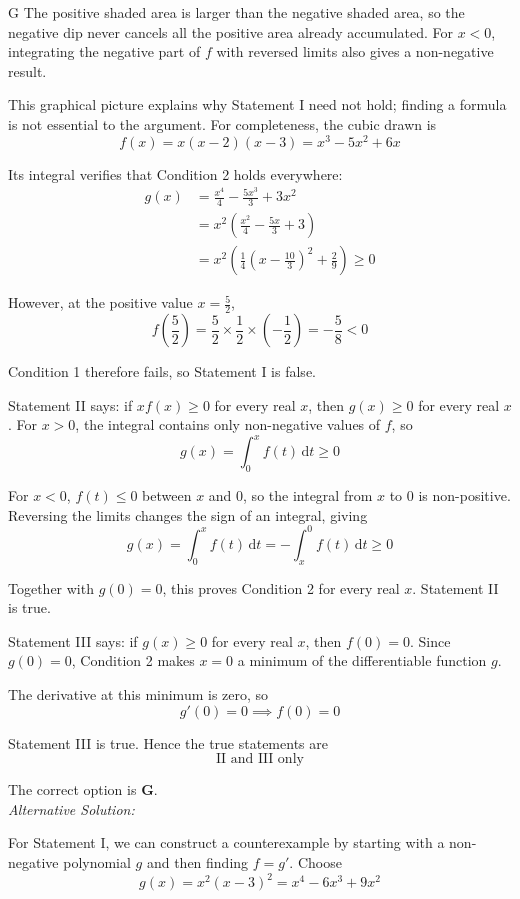 \documentclass[11pt,a4paper]{article}
\begin{document}
\begin{enumerate}[label=\textbf{\arabic*.},leftmargin=*,itemsep=0pt,start=10]
\begin{djsSolution}{G}
The positive shaded area is larger than the negative shaded area, so the negative dip never cancels all the positive area already accumulated. For $x<0$, integrating the negative part of $f$ with reversed limits also gives a non-negative result.

This graphical picture explains why Statement I need not hold; finding a formula is not essential to the argument. For completeness, the cubic drawn is
\[
f(x)=x(x-2)(x-3)=x^3-5x^2+6x
\]

Its integral verifies that Condition 2 holds everywhere:
\[
\begin{aligned}
g(x)&=\frac{x^4}{4}-\frac{5x^3}{3}+3x^2\\[8pt]
&=x^2\left(\frac{x^2}{4}-\frac{5x}{3}+3\right)\\[8pt]
&=x^2\left(\frac14\left(x-\frac{10}{3}\right)^2+\frac29\right)\geq0
\end{aligned}
\]

However, at the positive value $x=\frac52$,
\[
f\left(\frac52\right)=\frac52\times\frac12\times\left(-\frac12\right)=-\frac58<0
\]

Condition 1 therefore fails, so Statement I is false.

Statement II says: if $xf(x)\geq0$ for every real $x$, then $g(x)\geq0$ for every real $x$. For $x>0$, the integral contains only non-negative values of $f$, so
\[
g(x)=\int_0^x f(t)\,\mathrm{d}t\geq0
\]

For $x<0$, $f(t)\leq0$ between $x$ and $0$, so the integral from $x$ to $0$ is non-positive. Reversing the limits changes the sign of an integral, giving
\[
g(x)=\int_0^x f(t)\,\mathrm{d}t
=-\int_x^0 f(t)\,\mathrm{d}t\geq0
\]

Together with $g(0)=0$, this proves Condition 2 for every real $x$. Statement II is true.

Statement III says: if $g(x)\geq0$ for every real $x$, then $f(0)=0$. Since $g(0)=0$, Condition 2 makes $x=0$ a minimum of the differentiable function $g$.

The derivative at this minimum is zero, so
\[
g'(0)=0\implies f(0)=0
\]

Statement III is true. Hence the true statements are
\[
\boxed{\text{II and III only}}
\]

The correct option is \textbf{G}.\\[5pt]

\textit{Alternative Solution:}

For Statement I, we can construct a counterexample by starting with a non-negative polynomial $g$ and then finding $f=g'$. Choose
\[
g(x)=x^2(x-3)^2=x^4-6x^3+9x^2
\]


\end{djsSolution}
\end{enumerate}
\end{document}

